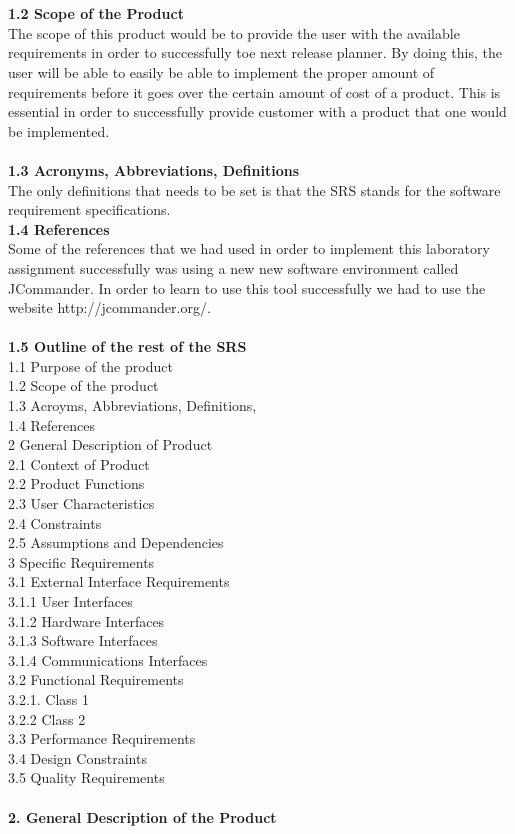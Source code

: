 \documentclass{article}
\begin{document}
\\
\\	
\textbf{\hspace{4ex} 1.2 Scope of the Product}
\\
The scope of this product would be to provide the user with the available requirements in order to successfully toe next release planner. By doing this, the user will be able to easily be able to implement the proper amount of requirements before it goes over the certain amount of cost of a product. This is essential in order to successfully provide customer with a product that one would be implemented.
\\
\\
\textbf{\hspace{4ex} 1.3 Acronyms, Abbreviations, Definitions}
\\
The only definitions that needs to be set is that the SRS stands for the software requirement specifications. 
\\
\noindent
\textbf{\hspace{4ex} 1.4 References}
\\
Some of the references that we had used in order to implement this laboratory assignment successfully was using a new new software environment called JCommander. In order to learn to use this tool successfully we had to use the website http://jcommander.org/.
\\
\\ 
\textbf{\hspace{4ex} 1.5 Outline of the rest of the SRS}
\\
1.1 Purpose of the product
\\
1.2 Scope of the product
\\
1.3 Acroyms, Abbreviations, Definitions,
\\
1.4 References
\\
2 General Description of Product
\\
2.1 Context of Product
\\
2.2 Product Functions
\\
2.3 User Characteristics
\\
2.4 Constraints
\\
2.5 Assumptions and Dependencies
\\
3 Specific Requirements
\\
3.1 External Interface Requirements
\\
3.1.1 User Interfaces
\\
3.1.2 Hardware Interfaces
\\
3.1.3 Software Interfaces
\\
3.1.4 Communications Interfaces
\\
3.2 Functional Requirements
\\
3.2.1. Class 1
\\
3.2.2 Class 2
\\
3.3 Performance Requirements
\\
3.4 Design Constraints
\\
3.5 Quality Requirements 
\\
\\
\noindent
\textbf{2. General Description of the Product}
\end{document}
